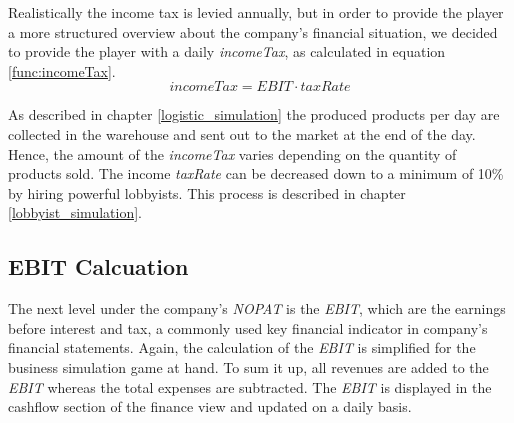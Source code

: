Realistically the income tax is levied annually, but in order to provide the player a more structured overview about the company’s financial situation, we decided to provide the player with a daily \textit{incomeTax}, as calculated in equation \ref{func:incomeTax}. 
\begin{equation}
    \label{func:incomeTax}
    incomeTax = EBIT \cdot taxRate
\end{equation}

As described in chapter \ref{logistic_simulation} the produced products per day are collected in the warehouse and sent out to the market at the end of the day. Hence, the amount of the \textit{incomeTax} varies depending on the quantity of products sold. The income \textit{taxRate} can be decreased down to a minimum of 10\% by hiring powerful lobbyists. This process is described in chapter \ref{lobbyist_simulation}.

\subsection{EBIT Calcuation}

The next level under the company's \textit{NOPAT} is the \textit{EBIT}, which are the earnings before interest and tax, a commonly used key financial indicator in company's financial statements. \cite{lee_e_2006} Again, the calculation of the \textit{EBIT} is simplified for the business simulation game at hand. To sum it up, all revenues are added to the \textit{EBIT} whereas the total expenses are subtracted. The \textit{EBIT} is displayed in the cashflow section of the finance view and updated on a daily basis.

